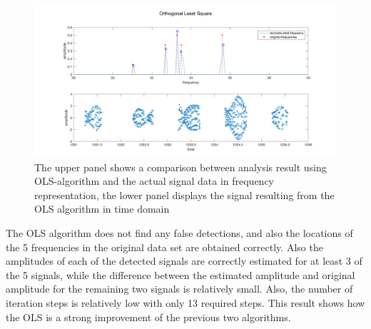 \begin{figure}[H]
	\centering
		\includegraphics[width=\textwidth]{images/ols}
		\caption{The upper panel shows a comparison between analysis result using OLS-algorithm and the actual signal data in frequency representation, the lower panel displays the signal resulting from the OLS algorithm in time domain}
		\label{fig:ols}
\end{figure}

The OLS algorithm does not find any false detections, and also the locations of the 5 frequencies in the original data set are obtained correctly. Also the amplitudes of each of the detected signals are correctly estimated for at least 3 of the 5 signals, while the difference between the estimated amplitude and original amplitude for the remaining two signals is relatively small. Also, the number of iteration steps is relatively low with only 13 required steps. This result shows how the OLS is a strong improvement of the previous two algorithms.






